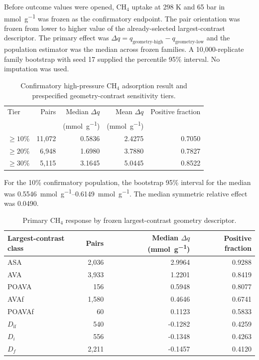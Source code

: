 \documentclass[11pt,a4paper]{article}
\begin{document}
Before outcome values were opened, CH$_4$ uptake at 298 K and 65 bar in
\si{\milli\mole\per\gram} was frozen as the confirmatory endpoint. The pair
orientation was frozen from lower to higher value of the already-selected
largest-contrast descriptor. The primary effect was
$\Delta q=q_{\mathrm{geometry\mbox{-}high}}-
q_{\mathrm{geometry\mbox{-}low}}$ and the population estimator was the median
across frozen families. A 10,000-replicate family bootstrap with seed 17 supplied
the percentile 95\% interval. No imputation was used.

\begin{table}[H]
\centering
\caption{Confirmatory high-pressure CH$_4$ adsorption result and prespecified
geometry-contrast sensitivity tiers.}
\label{tab:S8}
\begin{tabular}{lrrrr}
\toprule
Tier & Pairs & Median $\Delta q$ & Mean $\Delta q$ & Positive fraction \\
 & & (\si{\milli\mole\per\gram}) & (\si{\milli\mole\per\gram}) & \\
\midrule
$\geq10\%$ & 11,072 & 0.5836 & 2.4275 & 0.7050 \\
$\geq20\%$ & 6,948 & 1.6980 & 3.7880 & 0.7827 \\
$\geq30\%$ & 5,115 & 3.1645 & 5.0445 & 0.8522 \\
\bottomrule
\end{tabular}
\end{table}

For the 10\% confirmatory population, the bootstrap 95\% interval for the median
was \SIrange{0.5546}{0.6149}{\milli\mole\per\gram}. The median symmetric relative
effect was 0.0490.

\begin{table}[H]
\centering
\caption{Primary CH$_4$ response by frozen largest-contrast geometry descriptor.}
\label{tab:S9}
\begin{tabular}{lrrr}
\toprule
Largest-contrast class & Pairs & Median $\Delta q$ (\si{\milli\mole\per\gram}) &
Positive fraction \\
\midrule
ASA & 2,036 & 2.9964 & 0.9288 \\
AVA & 3,933 & 1.2201 & 0.8419 \\
POAVA & 156 & 0.5948 & 0.8077 \\
AVAf & 1,580 & 0.4646 & 0.6741 \\
POAVAf & 60 & 0.1123 & 0.5833 \\
$D_{\mathrm{if}}$ & 540 & -0.1282 & 0.4259 \\
$D_i$ & 556 & -0.1348 & 0.4263 \\
$D_f$ & 2,211 & -0.1457 & 0.4120 \\
\bottomrule
\end{tabular}
\end{table}
\end{document}
